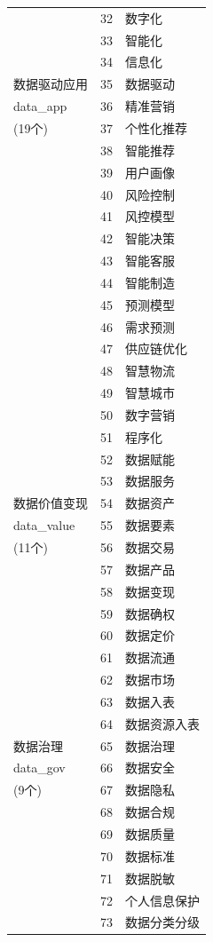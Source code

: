 {\begin{longtable}[]{@{}lll@{}}
& 32 & 数字化 \\
& 33 & 智能化 \\
& 34 & 信息化 \\
数据驱动应用 & 35 & 数据驱动 \\
data\_app & 36 & 精准营销 \\
(19个) & 37 & 个性化推荐 \\
& 38 & 智能推荐 \\
& 39 & 用户画像 \\
& 40 & 风险控制 \\
& 41 & 风控模型 \\
& 42 & 智能决策 \\
& 43 & 智能客服 \\
& 44 & 智能制造 \\
& 45 & 预测模型 \\
& 46 & 需求预测 \\
& 47 & 供应链优化 \\
& 48 & 智慧物流 \\
& 49 & 智慧城市 \\
& 50 & 数字营销 \\
& 51 & 程序化 \\
& 52 & 数据赋能 \\
& 53 & 数据服务 \\
数据价值变现 & 54 & 数据资产 \\
data\_value & 55 & 数据要素 \\
(11个) & 56 & 数据交易 \\
& 57 & 数据产品 \\
& 58 & 数据变现 \\
& 59 & 数据确权 \\
& 60 & 数据定价 \\
& 61 & 数据流通 \\
& 62 & 数据市场 \\
& 63 & 数据入表 \\
& 64 & 数据资源入表 \\
数据治理 & 65 & 数据治理 \\
data\_gov & 66 & 数据安全 \\
(9个) & 67 & 数据隐私 \\
& 68 & 数据合规 \\
& 69 & 数据质量 \\
& 70 & 数据标准 \\
& 71 & 数据脱敏 \\
& 72 & 个人信息保护 \\
& 73 & 数据分类分级 \\
\end{longtable}
}


